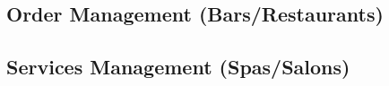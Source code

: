 \documentclass[]{VUMIFTemplateClass}
\begin{document}


\subsection{Order Management (Bars/Restaurants)}








\subsection{Services Management (Spas/Salons)}


\end{document}
